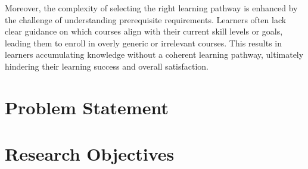 Moreover, the complexity of selecting the right learning pathway is enhanced by the challenge of understanding prerequisite requirements. Learners often lack clear guidance on which courses align with their current skill levels or goals, leading them to enroll in overly generic or irrelevant courses. This results in learners accumulating knowledge without a coherent learning pathway, ultimately hindering their learning success and overall satisfaction.


\section{Problem Statement}

\section{Research Objectives}